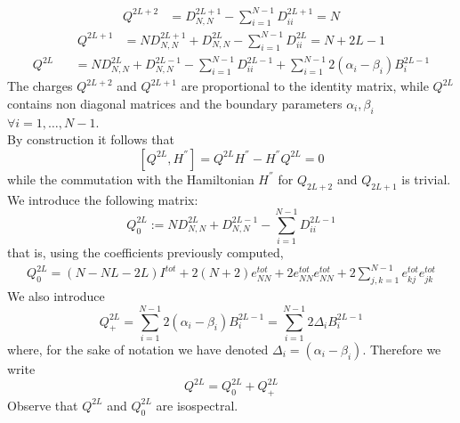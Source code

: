 \documentclass[10pt]{article}
\numberwithin{equation}{section}
\numberwithin{equation}{subsection}
\begin{document}
\begin{align}
Q^{2L+2}&=D_{N,N}^{2L+1}-\sum_{i=1}^{N-1}D_{ii}^{2L+1}=N
\end{align}
\begin{align}
Q^{2L+1}&=ND_{N,N}^{2L+1}+D_{N,N}^{2L}-\sum_{i=1}^{N-1}D_{ii}^{2L}=N+2L-1
\end{align}
\begin{align}
Q^{2L\phantom{+}}&=ND_{N,N}^{2L}+D_{N,N}^{2L-1}-\sum_{i=1}^{N-1}D_{ii}^{2L-1}+\sum_{i=1}^{N-1}2(\alpha_{i}-\beta_{i})B_{i}^{2L-1}
\end{align}
The charges $Q^{2L+2}$ and $Q^{2L+1}$ are proportional to the identity matrix, while $Q^{2L}$ contains non diagonal matrices and the boundary parameters $\alpha_{i},\beta_{i}$ $\forall i=1,\ldots,N-1$.\\
By construction it follows that 
\begin{equation}
\left[Q^{2L},H^{''}\right]=Q^{2L}H^{''}-H^{''}Q^{2L}=0
\end{equation}
while the commutation with the Hamiltonian $H^{''}$ for $Q_{2L+2}$ and $Q_{2L+1}$ is trivial. We introduce the following matrix:
\begin{equation}
Q^{2L}_{0}:=ND_{N,N}^{2L}+D_{N,N}^{2L-1}-\sum_{i=1}^{N-1}D_{ii}^{2L-1}
\end{equation}
that is, using the coefficients previously computed, 
\begin{equation}\label{Q0Exp}
\begin{split}
Q^{2L}_{0}=(N-NL-2L)I^{tot}+2(N+2)e_{NN}^{tot}+2e_{NN}^{tot}e_{NN}^{tot}+2\sum_{j,k=1}^{N-1}e_{kj}^{tot}e_{jk}^{tot}
\end{split}
\end{equation}
We also introduce 
\begin{equation}\label{Q-nonDiag}
Q_{+}^{2L}=\sum_{i=1}^{N-1}2(\alpha_{i}-\beta_{i})B_{i}^{2L-1}=\sum_{i=1}^{N-1}2\Delta_{i}B_{i}^{2L-1}
\end{equation}
where, for the sake of notation we have denoted $\Delta_{i}=(\alpha_{i}-\beta_{i})$. Therefore we write 
\begin{equation}
Q^{2L}=Q^{2L}_{0}+Q_{+}^{2L}
\end{equation}
Observe that $Q^{2L}$ and $Q^{2L}_{0}$ are isospectral. \\
\end{document}
